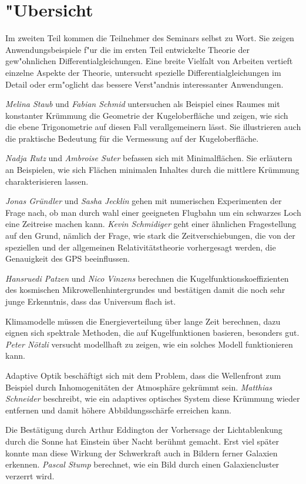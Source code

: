 %
%
%
\chapter*{"Ubersicht}
\rhead{}
\label{skript:uebersicht}
Im zweiten Teil kommen die Teilnehmer des Seminars selbst zu Wort.
Sie zeigen Anwendungsbeispiele f"ur die im ersten
Teil entwickelte Theorie der gew"ohnlichen Differentialgleichungen.
Eine breite Vielfalt von Arbeiten vertieft einzelne Aspekte der Theorie,
untersucht spezielle Differentialgleichungen im Detail
oder erm"oglicht das bessere Verst"andnis interessanter Anwendungen.

{\em Melina Staub} und {\em Fabian Schmid} untersuchen als Beispiel
eines Raumes mit konstanter Krümmung die Geometrie der Kugeloberfläche
und zeigen, wie sich die ebene Trigonometrie auf diesen Fall verallgemeinern
lässt.
Sie illustrieren auch die praktische Bedeutung für die Vermessung auf
der Kugeloberfläche.

{\em Nadja Rutz} und {\em Ambroise Suter} befassen sich mit Minimalflächen.
Sie erläutern an Beispielen, wie sich Flächen minimalen Inhaltes durch
die mittlere Krümmung charakterisieren lassen.

{\em Jonas Gründler} und {\em Sasha Jecklin} gehen mit numerischen
Experimenten der Frage nach, ob man durch wahl einer geeigneten
Flugbahn um ein schwarzes Loch eine Zeitreise machen kann.
{\em Kevin Schmidiger} geht einer ähnlichen Fragestellung auf den Grund,
nämlich der Frage, wie stark die Zeitverschiebungen, die von der
speziellen und der allgemeinen Relativitätstheorie vorhergesagt werden,
die Genauigkeit des GPS beeinflussen.

{\em Hansruedi Patzen} und {\em Nico Vinzens} berechnen
die Kugelfunktionskoeffizienten des kosmischen Mikrowellenhintergrundes
und bestätigen damit die noch sehr junge Erkenntnis, dass das
Universum flach ist.

Klimamodelle müssen die Energieverteilung über lange Zeit berechnen,
dazu eignen sich spektrale Methoden, die auf Kugelfunktionen basieren,
besonders gut. {\em Peter Nötzli} versucht modellhaft zu zeigen, wie
ein solches Modell funktionieren kann.

Adaptive Optik beschäftigt sich mit dem Problem, dass die Wellenfront
zum Beispiel durch Inhomogenitäten der Atmosphäre gekrümmt sein.
{\em Matthias Schneider} beschreibt, wie ein adaptives optisches 
System diese Krümmung wieder entfernen und damit höhere Abbildungsschärfe
erreichen kann.

Die Bestätigung durch Arthur Eddington der Vorhersage der Lichtablenkung
durch die Sonne hat Einstein über Nacht berühmt gemacht.
Erst viel später konnte man diese Wirkung der Schwerkraft auch in
Bildern ferner Galaxien erkennen.
{\em Pascal Stump} berechnet, wie ein Bild durch einen Galaxiencluster
verzerrt wird.

